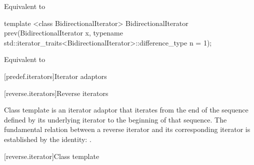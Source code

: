 \begin{itemdescr}
\pnum
\effects Equivalent to 
\end{itemdescr}

%
\begin{itemdecl}
template <class BidirectionalIterator>
  BidirectionalIterator prev(BidirectionalIterator x,
    typename std::iterator_traits<BidirectionalIterator>::difference_type n = 1);
\end{itemdecl}

\begin{itemdescr}
\pnum
\effects Equivalent to 
\end{itemdescr}

[predef.iterators]{Iterator adaptors}

[reverse.iterators]{Reverse iterators}

\pnum
Class template  is an iterator adaptor that iterates from the end of the sequence defined by its underlying iterator to the beginning of that sequence.
The fundamental relation between a reverse iterator and its corresponding iterator
is established by the identity:
.

[reverse.iterator]{Class template }


